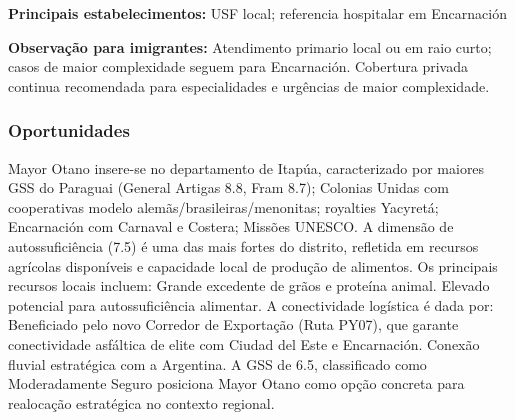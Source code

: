 \textbf{Principais estabelecimentos:} USF local; referencia hospitalar
em Encarnación

\textbf{Observação para imigrantes:} Atendimento primario local ou em
raio curto; casos de maior complexidade seguem para Encarnación.
Cobertura privada continua recomendada para especialidades e urgências
de maior complexidade.
\newpage

\subsubsection*{Oportunidades}\label{oport-mayor-otano-0730}
Mayor Otano insere-se no departamento de Itapúa, caracterizado por maiores GSS do Paraguai (General Artigas 8.8, Fram 8.7); Colonias Unidas com cooperativas modelo alemãs/brasileiras/menonitas; royalties Yacyretá; Encarnación com Carnaval e Costera; Missões UNESCO. A dimensão de autossuficiência (7.5) é uma das mais fortes do distrito, refletida em recursos agrícolas disponíveis e capacidade local de produção de alimentos. Os principais recursos locais incluem: Grande excedente de grãos e proteína animal. Elevado potencial para autossuficiência alimentar. A conectividade logística é dada por: Beneficiado pelo novo Corredor de Exportação (Ruta PY07), que garante conectividade asfáltica de elite com Ciudad del Este e Encarnación. Conexão fluvial estratégica com a Argentina. A GSS de 6.5, classificado como Moderadamente Seguro posiciona Mayor Otano como opção concreta para realocação estratégica no contexto regional.

